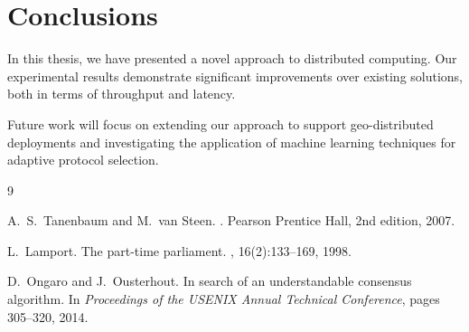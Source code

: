 \documentclass[master,english,lof,lot]{tvthesis}
\begin{document}
\lipsum[3]



\chapter{Conclusions}
\label{ch:conclusions}

In this thesis, we have presented a novel approach to distributed computing.
Our experimental results demonstrate significant improvements over existing
solutions, both in terms of throughput and latency.

Future work will focus on extending our approach to support geo-distributed
deployments and investigating the application of machine learning techniques
for adaptive protocol selection.



\begin{thebibliography}{9}

A.~S.~Tanenbaum and M.~van Steen.
.
\newblock Pearson Prentice Hall, 2nd edition, 2007.

L.~Lamport.
\newblock The part-time parliament.
, 16(2):133--169, 1998.

D.~Ongaro and J.~Ousterhout.
\newblock In search of an understandable consensus algorithm.
\newblock In {\em Proceedings of the USENIX Annual Technical Conference},
pages 305--320, 2014.

\end{thebibliography}
\end{document}
